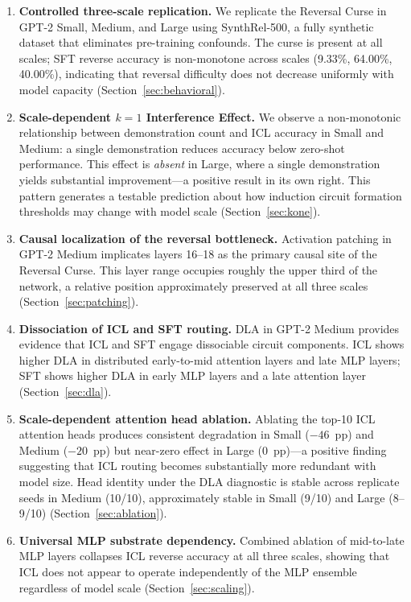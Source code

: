 \documentclass[11pt]{article}
\begin{document}
\begin{enumerate}
  \item \textbf{Controlled three-scale replication.} We replicate the Reversal
  Curse in GPT-2 Small, Medium, and Large using SynthRel-500, a fully synthetic
  dataset that eliminates pre-training confounds. The curse is present at all
  scales; SFT reverse accuracy is non-monotone across scales (9.33\%, 64.00\%,
  40.00\%), indicating that reversal difficulty does not decrease uniformly with
  model capacity (Section~\ref{sec:behavioral}).

  \item \textbf{Scale-dependent $k=1$ Interference Effect.} We observe a
  non-monotonic relationship between demonstration count and ICL accuracy in
  Small and Medium: a single demonstration reduces accuracy below zero-shot
  performance. This effect is \emph{absent} in Large, where a single
  demonstration yields substantial improvement---a positive result in its own
  right. This pattern generates a testable prediction about how induction
  circuit formation thresholds may change with model scale
  (Section~\ref{sec:kone}).

  \item \textbf{Causal localization of the reversal bottleneck.} Activation
  patching in GPT-2 Medium implicates layers 16--18 as the primary causal site
  of the Reversal Curse. This layer range occupies roughly the upper third of
  the network, a relative position approximately preserved at all three scales
  (Section~\ref{sec:patching}).

  \item \textbf{Dissociation of ICL and SFT routing.} DLA in GPT-2 Medium
  provides evidence that ICL and SFT engage dissociable circuit components.
  ICL shows higher DLA in distributed early-to-mid attention layers and late
  MLP layers; SFT shows higher DLA in early MLP layers and a late attention
  layer (Section~\ref{sec:dla}).

  \item \textbf{Scale-dependent attention head ablation.} Ablating the top-10
  ICL attention heads produces consistent degradation in Small ($-46$~pp) and
  Medium ($-20$~pp) but near-zero effect in Large ($0$~pp)---a positive finding
  suggesting that ICL routing becomes substantially more redundant with model
  size. Head identity under the DLA diagnostic is stable across replicate seeds
  in Medium (10/10), approximately stable in Small (9/10) and Large (8--9/10)
  (Section~\ref{sec:ablation}).

  \item \textbf{Universal MLP substrate dependency.} Combined ablation of
  mid-to-late MLP layers collapses ICL reverse accuracy at all three scales,
  showing that ICL does not appear to operate independently of the MLP ensemble
  regardless of model scale (Section~\ref{sec:scaling}).
\end{enumerate}
\end{document}
